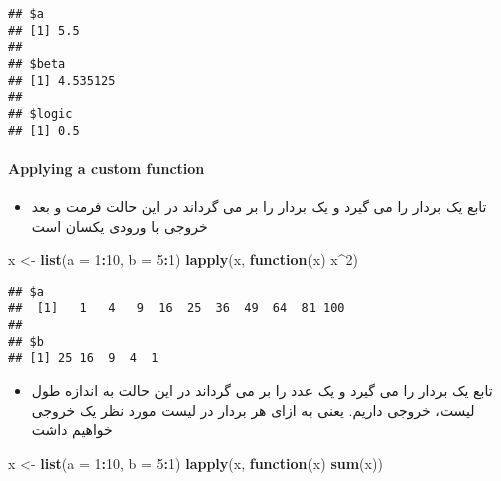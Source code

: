 \documentclass[
]{article}
\newenvironment{Shaded}{\begin{snugshade}}{\end{snugshade}}
\newcommand{\AttributeTok}[1]{\textcolor[rgb]{0.13,0.29,0.53}{#1}}
\newcommand{\ControlFlowTok}[1]{\textcolor[rgb]{0.13,0.29,0.53}{\textbf{#1}}}
\newcommand{\DecValTok}[1]{\textcolor[rgb]{0.00,0.00,0.81}{#1}}
\newcommand{\FunctionTok}[1]{\textcolor[rgb]{0.13,0.29,0.53}{\textbf{#1}}}
\newcommand{\NormalTok}[1]{#1}
\newcommand{\OtherTok}[1]{\textcolor[rgb]{0.56,0.35,0.01}{#1}}
\newcommand{\SpecialCharTok}[1]{\textcolor[rgb]{0.81,0.36,0.00}{\textbf{#1}}}
\providecommand{\tightlist}{%
  \setlength{\itemsep}{0pt}\setlength{\parskip}{0pt}}
\begin{document}
\begin{verbatim}
## $a
## [1] 5.5
## 
## $beta
## [1] 4.535125
## 
## $logic
## [1] 0.5
\end{verbatim}

\hypertarget{applying-a-custom-function-1}{%
\paragraph{Applying a custom
function}\label{applying-a-custom-function-1}}

\begin{itemize}
\tightlist
\item
  تابع یک بردار را می گیرد و یک بردار را بر می گرداند در این حالت فرمت و
  بعد خروجی با ورودی یکسان است
\end{itemize}

\begin{Shaded}
\begin{Highlighting}[]
\NormalTok{x }\OtherTok{\textless{}{-}} \FunctionTok{list}\NormalTok{(}\AttributeTok{a =} \DecValTok{1}\SpecialCharTok{:}\DecValTok{10}\NormalTok{, }\AttributeTok{b =} \DecValTok{5}\SpecialCharTok{:}\DecValTok{1}\NormalTok{)}
\FunctionTok{lapply}\NormalTok{(x, }\ControlFlowTok{function}\NormalTok{(x) x}\SpecialCharTok{\^{}}\DecValTok{2}\NormalTok{)}
\end{Highlighting}
\end{Shaded}

\begin{verbatim}
## $a
##  [1]   1   4   9  16  25  36  49  64  81 100
## 
## $b
## [1] 25 16  9  4  1
\end{verbatim}

\begin{itemize}
\tightlist
\item
  تابع یک بردار را می گیرد و یک عدد را بر می گرداند در این حالت به
  اندازه طول لیست، خروجی داریم. یعنی به ازای هر بردار در لیست مورد نظر
  یک خروجی خواهیم داشت
\end{itemize}

\begin{Shaded}
\begin{Highlighting}[]
\NormalTok{x }\OtherTok{\textless{}{-}} \FunctionTok{list}\NormalTok{(}\AttributeTok{a =} \DecValTok{1}\SpecialCharTok{:}\DecValTok{10}\NormalTok{, }\AttributeTok{b =} \DecValTok{5}\SpecialCharTok{:}\DecValTok{1}\NormalTok{)}
\FunctionTok{lapply}\NormalTok{(x, }\ControlFlowTok{function}\NormalTok{(x) }\FunctionTok{sum}\NormalTok{(x))}
\end{Highlighting}
\end{Shaded}
\end{document}

